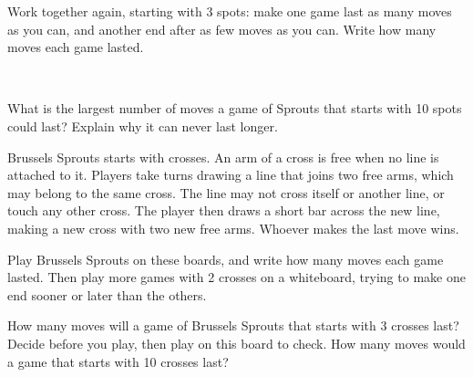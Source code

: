 \documentclass[12pt]{article}
\begin{document}
\newpage
\prob Work together again, starting with 3 spots: make one game last as many moves as you can, and another end after as few moves as you can. Write how many moves each game lasted.
\gap[4mm]
\begin{center}
\\[4mm]
\end{center}

\newpage
\prob What is the largest number of moves a game of Sprouts that starts with 10 spots could last? Explain why it can never last longer.
\gap[8mm]

Brussels Sprouts starts with crosses. An arm of a cross is free when no line is attached to it. Players take turns drawing a line that joins two free arms, which may belong to the same cross. The line may not cross itself or another line, or touch any other cross. The player then draws a short bar across the new line, making a new cross with two new free arms. Whoever makes the last move wins.
\gap[3mm]
\begin{center}\brusselsrules\end{center}
\gap[4mm]

\prob Play Brussels Sprouts on these boards, and write how many moves each game lasted. Then play more games with 2 crosses on a whiteboard, trying to make one end sooner or later than the others.
\gap[3mm]
\begin{center}
\hfill
{}
\end{center}

\newpage
\prob How many moves will a game of Brussels Sprouts that starts with 3 crosses last? Decide before you play, then play on this board to check. How many moves would a game that starts with 10 crosses last?
\gap[4mm]
\begin{center}
\end{center}
\gap[2mm]
\end{document}
